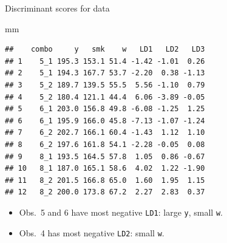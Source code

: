 \documentclass[ignorenonframetext,]{beamer}
\newenvironment{Shaded}{\begin{snugshade}}{\end{snugshade}}
\newcommand{\NormalTok}[1]{#1}
\begin{document}
\begin{frame}[fragile]{Discriminant scores for data}
\protect\hypertarget{discriminant-scores-for-data}{}

\begin{Shaded}
\begin{Highlighting}[]
\NormalTok{mm}
\end{Highlighting}
\end{Shaded}

\begin{verbatim}
##    combo     y   smk    w   LD1   LD2   LD3
## 1    5_1 195.3 153.1 51.4 -1.42 -1.01  0.26
## 2    5_1 194.3 167.7 53.7 -2.20  0.38 -1.13
## 3    5_2 189.7 139.5 55.5  5.56 -1.10  0.79
## 4    5_2 180.4 121.1 44.4  6.06 -3.89 -0.05
## 5    6_1 203.0 156.8 49.8 -6.08 -1.25  1.25
## 6    6_1 195.9 166.0 45.8 -7.13 -1.07 -1.24
## 7    6_2 202.7 166.1 60.4 -1.43  1.12  1.10
## 8    6_2 197.6 161.8 54.1 -2.28 -0.05  0.08
## 9    8_1 193.5 164.5 57.8  1.05  0.86 -0.67
## 10   8_1 187.0 165.1 58.6  4.02  1.22 -1.90
## 11   8_2 201.5 166.8 65.0  1.60  1.95  1.15
## 12   8_2 200.0 173.8 67.2  2.27  2.83  0.37
\end{verbatim}

\begin{itemize}
\item
  Obs.~5 and 6 have most negative \texttt{LD1}: large \texttt{y}, small
  \texttt{w}.
\item
  Obs.~4 has most negative \texttt{LD2}: small \texttt{w}.
\end{itemize}

\end{frame}
\end{document}
